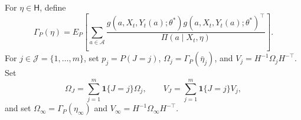 For \(\eta\in\mathsf H\), define
\[
 \Gamma_P(\eta)=E_P\!\left[\sum_{a\in\mathcal A}
 \frac{g(a,X_t,Y_t(a);\theta^*)g(a,X_t,Y_t(a);\theta^*)^\top}
 {\Pi(a\mid X_t,\eta)}\right].
\]
For \(j\in\mathcal J=\{1,\ldots,m\}\), set \(p_j=P(J=j)\), \(\Omega_j=\Gamma_P(\bar\eta_j)\), and \(V_j=H^{-1}\Omega_jH^{-\top}\). Set
\[
 \Omega_J=\sum_{j=1}^m\mathbf1\{J=j\}\Omega_j,\qquad
 V_J=\sum_{j=1}^m\mathbf1\{J=j\}V_j,
\]
and set \(\Omega_\infty=\Gamma_P(\eta_\infty)\) and \(V_\infty=H^{-1}\Omega_\infty H^{-\top}\).
